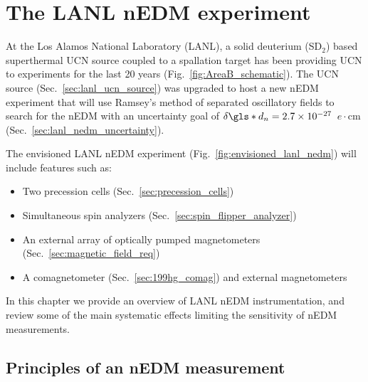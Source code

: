 
\chapter{The LANL nEDM experiment}\label{chap:LANL_nEDM}


At the Los Alamos National Laboratory (LANL), a solid deuterium (SD$_2$) based superthermal UCN source coupled to a spallation target has been providing UCN to experiments for the last 20 years (Fig.~\ref{fig:AreaB_schematic}). The UCN source (Sec.~\ref{sec:lanl_ucn_source}) was upgraded to host a new nEDM experiment that will use Ramsey's method of separated oscillatory fields to search for the nEDM with an uncertainty goal of $\delta \gls*{d_n} = 2.7\times 10^{-27}$~$e\cdot\text{cm}$ (Sec.~\ref{sec:lanl_nedm_uncertainty}).

The envisioned LANL nEDM experiment (Fig.~\ref{fig:envisioned_lanl_nedm}) will include features such as:
%
\begin{itemize}
    \item Two precession cells (Sec.~\ref{sec:precession_cells})
    \item Simultaneous spin analyzers (Sec.~\ref{sec:spin_flipper_analyzer})
    \item An external array of optically pumped magnetometers (Sec.~\ref{sec:magnetic_field_req})
    \item A \hg comagnetometer (Sec.~\ref{sec:199hg_comag}) and external \hg magnetometers
\end{itemize}

In this chapter we provide an overview of LANL nEDM instrumentation, and review some of the main systematic effects limiting the sensitivity of nEDM measurements.


\section{Principles of an nEDM measurement}\label{sec:principles_nEDM}


